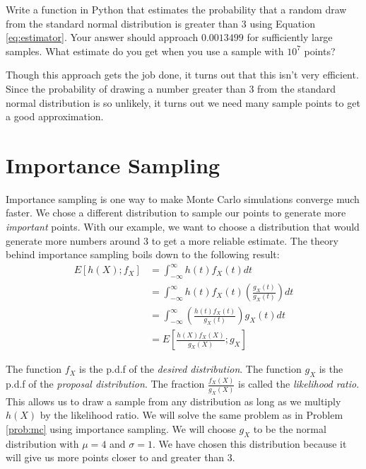 \begin{problem} \label{prob:mc}
Write a function in Python that estimates the probability that a random draw from the standard normal distribution is greater than 3 using Equation \ref{eq:estimator}. Your answer should approach $0.0013499$ for sufficiently large samples. What estimate do you get when you use a sample with $10^7$ points?
\end{problem}

Though this approach gets the job done, it turns out that this isn't very efficient. Since the probability of drawing a number greater than $3$ from the standard normal distribution is so unlikely, it turns out we need many sample points to get a good approximation.

\section*{Importance Sampling}
Importance sampling is one way to make Monte Carlo simulations converge much faster. We chose a different distribution to sample our points to generate more \emph{important} points. With our example, we want to choose a distribution that would generate more numbers around 3 to get a more reliable estimate. The theory behind importance sampling boils down to the following result:
\begin{equation} \label{eq:importance}
\begin{split}
E[h(X);f_X] & = \int_{-\infty}^{\infty} h(t)f_X(t) dt \\
& = \int_{-\infty}^{\infty} h(t)f_X(t)\left ( \frac{g_X(t)}{g_X(t)} \right ) dt \\
& = \int_{-\infty}^{\infty} \left ( \frac{h(t)f_X(t)}{g_X(t)} \right )g_X(t) dt \\
& = E\left [ \frac{h(X)f_X(X)}{g_X(X)} ; g_X \right ]
\end{split}
\end{equation}

The function $f_X$ is the p.d.f of the \emph{desired distribution}. The function $g_X$ is the p.d.f of the \emph{proposal distribution}. The fraction $\frac{f_X(X)}{g_X(X)}$ is called the \emph{likelihood ratio}. This allows us to draw a sample from any distribution as long as we multiply $h(X)$ by the likelihood ratio. We will solve the same problem as in Problem \ref{prob:mc} using importance sampling. We will choose $g_X$ to be the normal distribution with $\mu = 4$ and $\sigma = 1$. We have chosen this distribution because it will give us more points closer to and greater than 3.

